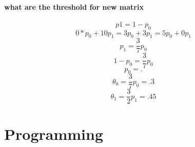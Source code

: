 \documentclass{article}
\begin{document}
\subsection{what are the threshold for new matrix}
$$p1 = 1 - p_0$$
$$ 0*p_0 +10p_1 = 3p_0 + 3p_1 = 5p_0 + 0p_1$$
$$p_1 = \frac{3}{7}p_0 $$
$$1-p_0 = \frac{3}{7}p_0 $$ 
$$p_0 = . $$
$$\theta{_0} = \frac{3}{7}p_0  = .3 $$
$$\theta{_1} = \frac{3}{2}p_1 = .45$$
\part{Programming}
\end{document}

